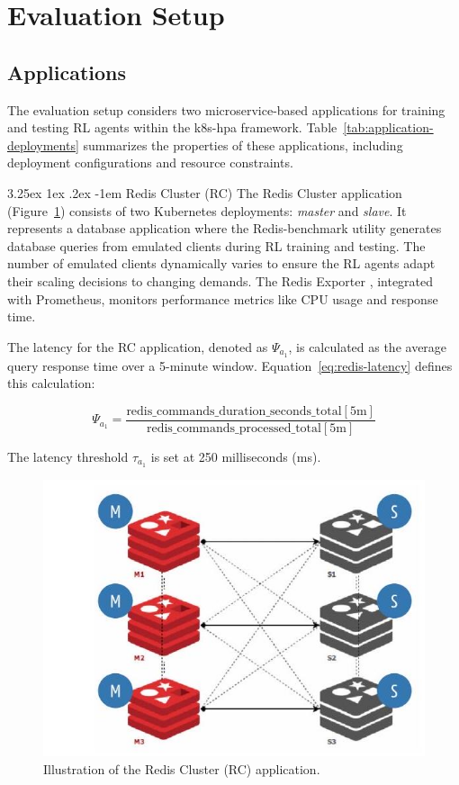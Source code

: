 \documentclass[conference]{IEEEtran}
\makeatletter
\renewcommand\paragraph{\@startsection{paragraph}{5}{\z@}%
  {3.25ex \@plus1ex \@minus.2ex}%
  {-1em}%
  {\normalfont\normalsize\bfseries}}
\makeatother
\begin{document}
\section{Evaluation Setup}
\label{sec:evaluation_setup}
\subsection{Applications}

The evaluation setup considers two microservice-based applications for training and testing RL agents within the k8s-hpa framework. Table~\ref{tab:application-deployments} summarizes the properties of these applications, including deployment configurations and resource constraints.

\paragraph{Redis Cluster (RC)} 
The Redis Cluster application (Figure~\ref{fig:redis-cluster}) consists of two Kubernetes deployments: \textit{master} and \textit{slave}. It represents a database application where the Redis-benchmark utility \cite{redisBenchmark} generates database queries from emulated clients during RL training and testing. The number of emulated clients dynamically varies to ensure the RL agents adapt their scaling decisions to changing demands. The Redis Exporter \cite{redisExporter}, integrated with Prometheus, monitors performance metrics like CPU usage and response time.

The latency for the RC application, denoted as $\Psi_{a_1}$, is calculated as the average query response time over a 5-minute window. Equation~\ref{eq:redis-latency} defines this calculation:

\begin{equation}
    \Psi_{a_1} = \frac{\text{redis\_commands\_duration\_seconds\_total}[5\text{m}]}{\text{redis\_commands\_processed\_total}[5\text{m}]}
    \label{eq:redis-latency}
\end{equation}

The latency threshold $\tau_{a_1}$ is set at 250 milliseconds (ms).

\begin{figure}[h]
    \centering
    \includegraphics[width=0.8\linewidth]{images/2024_11_17_21ad14b6196e5740bf69g-6(1)}
    \caption{Illustration of the Redis Cluster (RC) application.}
    \label{fig:redis-cluster}
\end{figure}
\end{document}
